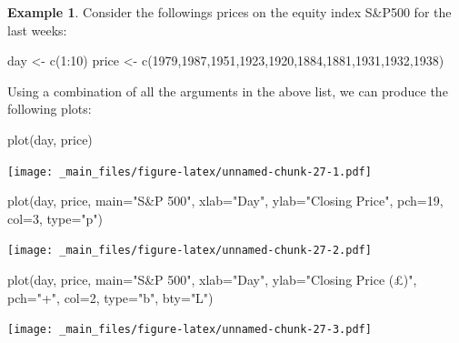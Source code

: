 \documentclass[
]{book}
\newenvironment{Shaded}{\begin{snugshade}}{\end{snugshade}}
\newcommand{\AttributeTok}[1]{\textcolor[rgb]{0.77,0.63,0.00}{#1}}
\newcommand{\DecValTok}[1]{\textcolor[rgb]{0.00,0.00,0.81}{#1}}
\newcommand{\FunctionTok}[1]{\textcolor[rgb]{0.00,0.00,0.00}{#1}}
\newcommand{\NormalTok}[1]{#1}
\newcommand{\OtherTok}[1]{\textcolor[rgb]{0.56,0.35,0.01}{#1}}
\newcommand{\SpecialCharTok}[1]{\textcolor[rgb]{0.00,0.00,0.00}{#1}}
\newcommand{\StringTok}[1]{\textcolor[rgb]{0.31,0.60,0.02}{#1}}
\theoremstyle{definition}
\theoremstyle{definition}
\newtheorem{example}{Example}[chapter]
\theoremstyle{definition}
\theoremstyle{definition}
\theoremstyle{remark}
\begin{document}
\begin{example}
Consider the followings prices on the equity index S\&P500 for the last weeks:

\begin{Shaded}
\begin{Highlighting}[]
\NormalTok{day }\OtherTok{\textless{}{-}} \FunctionTok{c}\NormalTok{(}\DecValTok{1}\SpecialCharTok{:}\DecValTok{10}\NormalTok{)}
\NormalTok{price }\OtherTok{\textless{}{-}} \FunctionTok{c}\NormalTok{(}\DecValTok{1979}\NormalTok{,}\DecValTok{1987}\NormalTok{,}\DecValTok{1951}\NormalTok{,}\DecValTok{1923}\NormalTok{,}\DecValTok{1920}\NormalTok{,}\DecValTok{1884}\NormalTok{,}\DecValTok{1881}\NormalTok{,}\DecValTok{1931}\NormalTok{,}\DecValTok{1932}\NormalTok{,}\DecValTok{1938}\NormalTok{)}
\end{Highlighting}
\end{Shaded}

Using a combination of all the arguments in the above list, we can produce the following plots:

\begin{Shaded}
\begin{Highlighting}[]
\FunctionTok{plot}\NormalTok{(day, price)}
\end{Highlighting}
\end{Shaded}

\texttt{[image: \_main\_files/figure-latex/unnamed-chunk-27-1.pdf]}

\begin{Shaded}
\begin{Highlighting}[]
\FunctionTok{plot}\NormalTok{(day, price,}
     \AttributeTok{main=}\StringTok{"S\&P 500"}\NormalTok{,}
     \AttributeTok{xlab=}\StringTok{"Day"}\NormalTok{,}
     \AttributeTok{ylab=}\StringTok{"Closing Price"}\NormalTok{,}
     \AttributeTok{pch=}\DecValTok{19}\NormalTok{,}
     \AttributeTok{col=}\DecValTok{3}\NormalTok{,}
     \AttributeTok{type=}\StringTok{"p"}\NormalTok{)}
\end{Highlighting}
\end{Shaded}

\texttt{[image: \_main\_files/figure-latex/unnamed-chunk-27-2.pdf]}

\begin{Shaded}
\begin{Highlighting}[]
\FunctionTok{plot}\NormalTok{(day, price,}
     \AttributeTok{main=}\StringTok{"S\&P 500"}\NormalTok{,}
     \AttributeTok{xlab=}\StringTok{"Day"}\NormalTok{,}
     \AttributeTok{ylab=}\StringTok{"Closing Price (£)"}\NormalTok{,}
     \AttributeTok{pch=}\StringTok{"+"}\NormalTok{,}
     \AttributeTok{col=}\DecValTok{2}\NormalTok{,}
     \AttributeTok{type=}\StringTok{"b"}\NormalTok{,}
     \AttributeTok{bty=}\StringTok{"L"}\NormalTok{)}
\end{Highlighting}
\end{Shaded}

\texttt{[image: \_main\_files/figure-latex/unnamed-chunk-27-3.pdf]}
\end{example}
\end{document}
